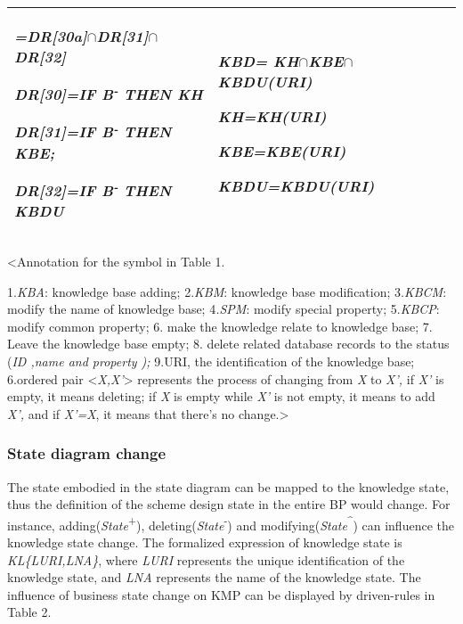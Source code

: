 \documentclass{elsarticle}
\begin{document}
\begin{table}[!htb]
\begin{supertabular}{m{0.97885984in}|m{2.1636598in}|m{2.49486in}}
{\sffamily
\textrm{\textit{=DR[30a]${\cap}$DR[31]${\cap}$DR[32]}}}

{\sffamily \textrm{\textit{DR[30]=IF
B}}\textrm{\textit{\textsuperscript{{}-}}}\textrm{\textit{ THEN KH}}}

{\sffamily \textrm{\textit{DR[31]=IF
B}}\textrm{\textit{\textsuperscript{{}-}}}\textrm{\textit{ THEN
KBE;}}}

\sffamily \textrm{\textit{DR[32]=IF
B}}\textrm{\textit{\textsuperscript{{}-}}}\textrm{\textit{ THEN KBDU}}
&
{\sffamily \textrm{\textbf{\textit{KBD=
KH${\cap}$KBE${\cap}$KBDU(URI)}}}}

{\itshape KH=KH(URI)}

{\itshape KBE=KBE(URI)}

\itshape KBDU=KBDU(URI)\\\hline

\end{supertabular}
\end{table}


{\textless}Annotation for the symbol in Table 1.

1.\textrm{\textit{KBA}}\textrm{: knowledge base adding;
2.}\textrm{\textit{KBM}}\textrm{: knowledge base modification;
3.}\textrm{\textit{KBCM}}\textrm{: modify the name of knowledge base;
4}\textrm{\textit{.SPM}}\textrm{: modify special property;
5.}\textrm{\textit{KBCP}}\textrm{: modify common property; 6. make
the knowledge relate to knowledge base; 7. Leave the knowledge base
empty; 8. delete related database records to the status
(}\textrm{\textit{ID ,name and property ); }}\textrm{9.URI, the
identification of the knowledge base;
6.}\textrm{{ordered pair
{\textless}}}\textrm{\textit{{X,X'}}}\textrm{{{\textgreater}}}
\textrm{represents the process of changing from }\textrm{\textit{X
}}\textrm{to }\textrm{\textit{X',}}\textrm{ if
}\textrm{\textit{X'}}\textrm{ is empty, it means deleting; if
}\textrm{\textit{X }}\textrm{is empty while }\textrm{\textit{X'
}}\textrm{is not empty, it means to add }\textrm{\textit{X',
}}\textrm{and if }\textrm{\textit{X'=X}}\textrm{, it means that there's
no change}\textrm{{.{\textgreater}}}


\subsubsection{State diagram change}


\textrm{The state embodied in the state diagram can be mapped to the
knowledge state, thus the definition of the scheme design state in the
entire BP would change. For instance,
adding(}\textrm{\textit{State}}\textrm{\textsuperscript{+}}\textrm{),
deleting(}\textrm{\textit{State}}\textrm{\textsuperscript{{}-}}\textrm{)
and
modifying(}\textrm{\textit{State}}\textrm{\textsuperscript{\^{}}}\textrm{)
can influence the knowledge state change. The formalized expression of
knowledge state is }\textrm{\textit{KL\{LURI,LNA\}}}\textrm{,
where }\textrm{\textit{LURI}}\textrm{ represents the unique
identification of the knowledge state, and}\textrm{\textit{
LNA}}\textrm{ represents the name of the knowledge state. The influence
of business state change on KMP can be displayed by driven-rules in
Table 2.}
\end{document}

